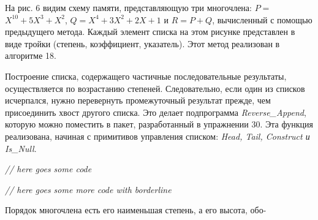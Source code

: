 \documentclass{../../template/mai_book}
\begin{document}

На рис. 6 видим схему памяти, представляющую три многочлена: $P =$ \linebreak $X^{10} + 5X^3 + X^2$, $Q = X^4 + 3X^2 + 2X + 1$ и $R = P + Q$, вычисленный с помощью предыдущего метода. Каждый элемент списка на этом рисунке представлен в виде тройки (степень, коэффициент, указатель). Этот метод реализован в алгоритме 18.

Построение списка, содержащего частичные последовательные результаты, осуществляется по возрастанию степеней. Следовательно, если один из списков исчерпался, нужно перевернуть промежуточный результат \linebreak прежде, чем присоединить хвост другого списка. Это делает подпрограмма \textit{Reverse\_Append}, которую можно поместить в пакет, разработанный в \linebreak упражнении 30. Эта функция реализована, начиная с примитивов управления списком: \textit{Head, Tail, Construct и Is\_Null}. \newline

\textit{// here goes some code} \newline

\textit{// here goes some more code with borderline} \newline 

Порядок многочлена есть его наименьшая степень, а его высота, обо- \linebreak

\newpage

\end{document}
